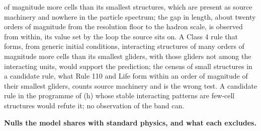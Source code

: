 \documentclass[
]{article}
\begin{document}
\begin{enumerate}
  of magnitude more cells than its smallest structures, which are
  present as source machinery and nowhere in the particle spectrum; the
  gap in length, about twenty orders of magnitude from the resolution
  floor to the hadron scale, is observed from within, its value set by
  the loop the source sits on. A Class 4 rule that forms, from generic
  initial conditions, interacting structures of many orders of magnitude
  more cells than its smallest gliders, with those gliders not among the
  interacting units, would support the prediction; the census of small
  structures in a candidate rule, what Rule 110 and Life form within an
  order of magnitude of their smallest gliders, counts source machinery
  and is the wrong test. A candidate rule in the programme of (h) whose
  stable interacting patterns are few-cell structures would refute it;
  no observation of the band can.
\end{enumerate}

\textbf{Nulls the model shares with standard physics, and what each
excludes.}
\end{document}
